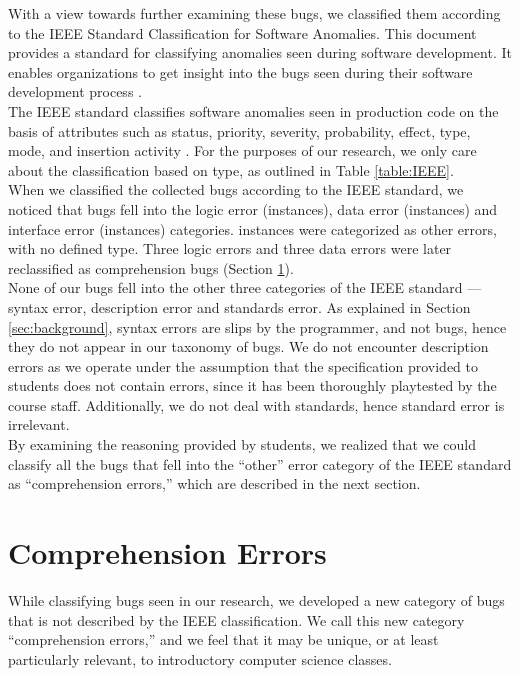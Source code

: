 \documentclass{sig-alternate}
\begin{document}
With a view towards further examining these bugs, we classified them according to the IEEE Standard Classification for Software Anomalies. This document provides a standard for classifying anomalies seen during software development. It enables organizations to get insight into the bugs seen during their software development process \cite{IEEE10}.\\

The IEEE standard classifies software anomalies seen in production code on the basis of attributes such as status, priority, severity, probability, effect, type, mode, and insertion activity \cite{IEEE10}. For the purposes of our research, we only care about the classification based on type, as outlined in Table \ref{table:IEEE}.\\


When we classified the collected bugs according to the IEEE standard, we noticed that bugs fell into the logic error (\numlogicIEEE instances), data error (\numdataIEEE instances) and interface error (\numinterfaceIEEE instances) categories. \numotherIEEE instances were categorized as other errors, with no defined type. Three logic errors and three data errors were later reclassified as comprehension bugs (Section \ref{sec:comprehension}).\\

None of our bugs fell into the other three categories of the IEEE standard --- syntax error, description error and standards error. As explained in Section \ref{sec:background}, syntax errors are slips by the programmer, and not bugs, hence they do not appear in our taxonomy of bugs. We do not encounter description errors as we operate under the assumption that the specification provided to students does not contain errors, since it has been thoroughly playtested by the course staff. Additionally, we do not deal with standards, hence standard error is irrelevant.\\

By examining the reasoning provided by students, we realized that we could classify all the bugs that fell into the ``other'' error category of the IEEE standard as ``comprehension errors,'' which are described in the next section.

\section{Comprehension Errors}
\label{sec:comprehension}

While classifying bugs seen in our research, we developed a new category of bugs that is not described by the IEEE classification. We call this new category ``comprehension errors,'' and we feel that it may be unique, or at least particularly relevant, to introductory computer science classes.\\
\end{document}
